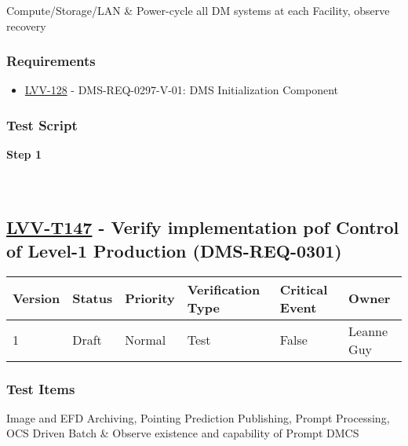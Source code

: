 Compute/Storage/LAN \& Power-cycle all DM systems at each Facility,
observe recovery

\hypertarget{requirements-123}{%
\subsubsection{Requirements}\label{requirements-123}}

\begin{itemize}
\tightlist
\item
  \href{https://jira.lsstcorp.org/browse/LVV-128}{LVV-128} -
  DMS-REQ-0297-V-01: DMS Initialization Component
\end{itemize}

\hypertarget{test-script-123}{%
\subsubsection{Test Script}\label{test-script-123}}

\textbf{Step 1}\\
~\\
~\\

\hypertarget{lvv-t147---verify-implementation-pof-control-of-level-1-production-dms-req-0301}{%
\subsection{\texorpdfstring{\href{https://jira.lsstcorp.org/secure/Tests.jspa\#/testCase/LVV-T147}{LVV-T147}
- Verify implementation pof Control of Level-1 Production
(DMS-REQ-0301)}{LVV-T147 - Verify implementation pof Control of Level-1 Production (DMS-REQ-0301)}}\label{lvv-t147---verify-implementation-pof-control-of-level-1-production-dms-req-0301}}

\begin{longtable}[]{@{}llllll@{}}
\toprule
Version & Status & Priority & Verification Type & Critical Event &
Owner\tabularnewline
\midrule
\endhead
1 & Draft & Normal & Test & False & Leanne Guy\tabularnewline
\bottomrule
\end{longtable}

\hypertarget{test-items-123}{%
\subsubsection{Test Items}\label{test-items-123}}

Image and EFD Archiving, Pointing Prediction Publishing, Prompt
Processing, OCS Driven Batch \& Observe existence and capability of
Prompt DMCS

